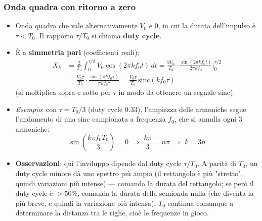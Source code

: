 \documentclass[12pt, a4paper]{article}
\begin{document}
\subsubsection{Onda quadra con ritorno a zero}
\begin{itemize}
    \item Onda quadra che vale alternativamente $V_0$ e $0$, in cui la durata dell'impulso è $\tau<T_0$. Il rapporto $\tau/T_0$ si chiama \textbf{duty cycle}.
    \item È a \textbf{simmetria pari} (coefficienti reali):
    \begin{align*}
        X_k &= \frac{2}{T_0}\int_0^{\tau/2} V_0\cos(2\pi kf_0t)\,dt = \frac{2V_0}{T_0}\cdot\frac{\sin(2\pi kf_0t)}{2\pi kf_0}\Big|_0^{\tau/2} \\
        &= \frac{V_0\tau}{T_0}\cdot\frac{\sin(\pi kf_0\tau)}{\pi kf_0\tau} = \frac{V_0\tau}{T_0}\,\text{sinc}(kf_0\tau)
    \end{align*}
    (si moltiplica sopra e sotto per $\tau$ in modo da ottenere un segnale sinc).
    \item \textit{Esempio}: con $\tau=T_0/3$ (duty cycle $0.33$), l'ampiezza delle armoniche segue l'andamento di una sinc campionata a frequenza $f_0$, che si annulla ogni 3 armoniche:
    $$\sin\!\left(\frac{k\pi f_0T_0}{3}\right)=0 \;\Rightarrow\; \frac{k\pi}{3}=n\pi \;\Rightarrow\; k=3n$$
    \item \textbf{Osservazioni}: qui l'inviluppo dipende dal duty cycle $\tau/T_0$. A parità di $T_0$, un duty cycle minore dà uno spettro più ampio (il rettangolo è più "stretto", quindi variazioni più intense) — comanda la durata del rettangolo; se però il duty cycle è $>50\%$, comanda la durata della semionda nulla (che diventa la più breve, e quindi la variazione più intensa). $T_0$ continua comunque a determinare la distanza tra le righe, cioè le frequenze in gioco.
\end{itemize}
\end{document}
